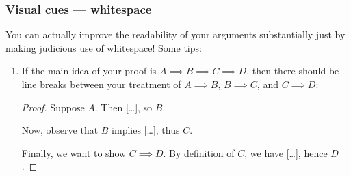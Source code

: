 \documentclass{fkpset}
\begin{document}
\subsubsection{Visual cues --- whitespace}
You can actually improve the readability of your arguments substantially just by
making judicious use of whitespace! Some tips:
\begin{enumerate}[label=(\arabic*)]
  \item If the main idea of your proof is $A \implies B \implies C \implies D$,
    then there should be line breaks between your treatment of $A \implies B$,
    $B \implies C$, and $C \implies D$:
    \begin{leftbar}
      \begin{proof}
        Suppose $A$. Then [\ldots], so $B$.

        Now, observe that $B$ implies [\ldots], thus $C$.

        Finally, we want to show $C \implies D$. By definition of $C$, we
        have [\ldots], hence $D$.


\end{proof}
\end{leftbar}
\end{enumerate}
\end{document}
